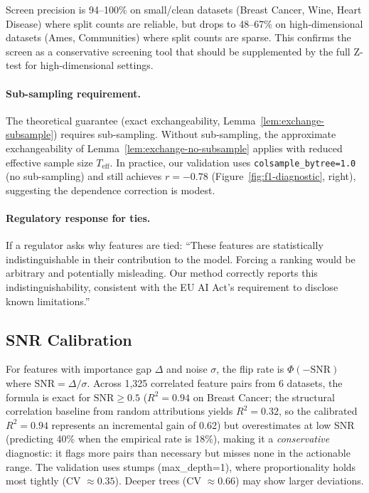 \documentclass{article}
\begin{document}
Screen precision is 94--100\% on small/clean datasets (Breast Cancer, Wine, Heart Disease) where split counts are reliable, but drops to 48--67\% on high-dimensional datasets (Ames, Communities) where split counts are sparse. This confirms the screen as a conservative screening tool that should be supplemented by the full Z-test for high-dimensional settings.

\paragraph{Sub-sampling requirement.}
The theoretical guarantee (exact exchangeability,
Lemma~\ref{lem:exchange-subsample}) requires sub-sampling.
Without sub-sampling, the approximate exchangeability of
Lemma~\ref{lem:exchange-no-subsample} applies with reduced effective
sample size $T_{\text{eff}}$.
In practice, our validation uses \texttt{colsample\_bytree=1.0}
(no sub-sampling) and still achieves $r = -0.78$
(Figure~\ref{fig:f1-diagnostic}, right), suggesting the dependence
correction is modest.

\paragraph{Regulatory response for ties.}
If a regulator asks why features are tied: ``These features are statistically indistinguishable in their contribution to the model. Forcing a ranking would be arbitrary and potentially misleading. Our method correctly reports this indistinguishability, consistent with the EU AI Act's requirement to disclose known limitations.''

\subsection{SNR Calibration}
\label{sec:snr}

For features with importance gap $\Delta$ and noise $\sigma$, the flip rate is $\Phi(-\text{SNR})$ where $\text{SNR} = \Delta/\sigma$. Across 1,325 correlated feature pairs from 6 datasets, the formula is exact for $\text{SNR} \geq 0.5$ ($R^2 = 0.94$ on Breast Cancer; the structural correlation baseline from random attributions yields $R^2 = 0.32$, so the calibrated $R^2 = 0.94$ represents an incremental gain of 0.62) but overestimates at low SNR (predicting 40\% when the empirical rate is 18\%), making it a \emph{conservative} diagnostic: it flags more pairs than necessary but misses none in the actionable range. The validation uses stumps (max\_depth=1), where proportionality holds most tightly (CV $\approx 0.35$). Deeper trees (CV $\approx 0.66$) may show larger deviations.
\end{document}
